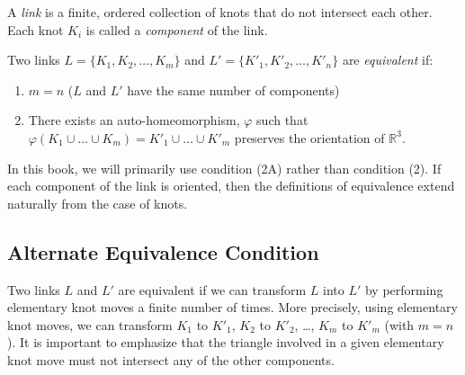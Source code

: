 \documentclass[11pt]{article}
\begin{document}
A \emph{link} is a finite, ordered collection of knots that do not intersect each other. Each knot \(K_i\) is called a \emph{component} of the link.

Two links \(L = \{K_1, K_2, \ldots, K_m\}\) and \(L' = \{K'_1, K'_2, \ldots, K'_n\}\) are  \emph{equivalent} if:

\begin{enumerate}
    \item \(m = n\) (\(L\) and \(L'\) have the same number of components)
    \item  There exists an auto-homeomorphism, \(\varphi \) such that \( \varphi(K_1 \cup \ldots \cup K_m)=K'_1 \cup \ldots \cup K'_m\) preserves the orientation of \(\mathbb{R}^3\).
\end{enumerate}

In this book, we will primarily use condition (2A) rather than condition (2). If each component of the link is oriented, then the definitions of equivalence extend naturally from the case of knots.

\subsection*{Alternate Equivalence Condition}
Two links \(L\) and \(L'\) are equivalent if we can transform \(L\) into \(L'\) by performing elementary knot moves a finite number of times. More precisely, using elementary knot moves, we can transform \(K_1\) to \(K'_1\), \(K_2\) to \(K'_2\), \ldots, \(K_m\) to \(K'_m\) (with \(m = n\)). It is important to emphasize that the triangle involved in a given elementary knot move must not intersect any of the other components.
\end{document}
